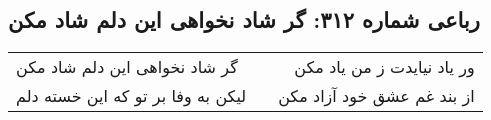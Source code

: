 \begin{center}
\section*{رباعی شماره ۳۱۲: گر شاد نخواهی این دلم شاد مکن}
\label{sec:sh312}
\begin{longtable}{l p{0.5cm} r}
گر شاد نخواهی این دلم شاد مکن
&&
ور یاد نیایدت ز من یاد مکن
\\
لیکن به وفا بر تو که این خسته دلم
&&
از بند غم عشق خود آزاد مکن
\\
\end{longtable}
\end{center}
